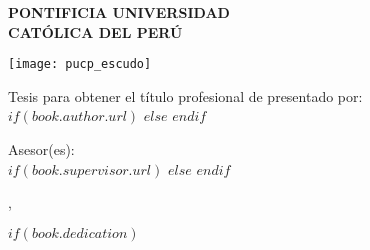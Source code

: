 \pagestyle{empty} %

\begin{titlepage}
\begin{center}

{\MakeUppercase{\textbf{PONTIFICIA UNIVERSIDAD \\ CATÓLICA DEL PERÚ}}\par}\vspace{0.25cm} %
\MakeUppercase{\textbf{\facname}}\vspace{0.5cm} %

\texttt{[image: pucp\_escudo]}\vspace{0.5cm}

{\textbf{\ttitle}\par}\vspace{0.4cm} %

{Tesis para obtener el título profesional de \degreename}{ presentado por:}\\[0.3cm] %

$if(book.author.url)$
\href{$book.author.url$}{\authorname} %
$else$
\authorname
$endif$

{Asesor(es):}\\[0.4cm]
$if(book.supervisor.url)$%
\href{$book.supervisor.url$}{\supname} %
$else$%
\supname
$endif$

{\cityname}{, }{\dateyearname}

\vfill
\end{center}
\end{titlepage}

$if(book.dedication)$

\dedicatory{} 
\newpage

